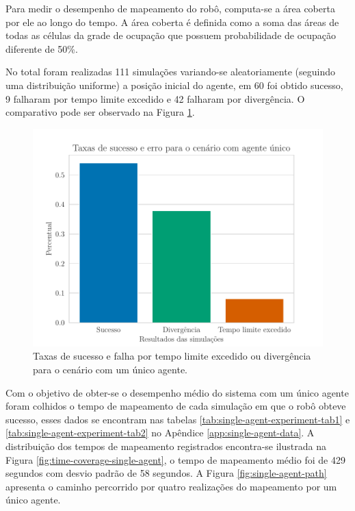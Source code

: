 Para medir o desempenho de mapeamento do robô, 
computa-se a área coberta 
por ele ao longo do tempo. A área coberta é definida como a soma das 
áreas de todas as células da grade de ocupação que possuem probabilidade 
de ocupação diferente de 50\%.

No total foram realizadas 111 simulações variando-se aleatoriamente (seguindo uma distribuição uniforme) a posição inicial do agente, em 60 foi obtido 
sucesso, 9 falharam por tempo limite excedido e 42 falharam por 
divergência. O comparativo pode ser observado na Figura \ref{fig:exp-single-robot-sucess-rate}.
\begin{figure}
  \centering
  \includegraphics[width=.7\textwidth]{figs/success_rate_bar_single_robot.pdf}
  \caption[Taxas de sucesso e falha pra simulações com um único agente]{Taxas de sucesso e falha por tempo limite excedido ou divergência para o cenário com um único agente.}
  \label{fig:exp-single-robot-sucess-rate}
\end{figure}

Com o objetivo de obter-se o desempenho médio do sistema com um único 
agente foram colhidos o tempo de mapeamento de cada simulação em que o
robô obteve sucesso, esses dados se encontram nas tabelas \ref{tab:single-agent-experiment-tab1} e \ref{tab:single-agent-experiment-tab2} no Apêndice 
\ref{app:single-agent-data}. A distribuição dos tempos de mapeamento 
registrados encontra-se ilustrada na Figura \ref{fig:time-coverage-single-agent}, o tempo de mapeamento médio foi de 
429 segundos com desvio padrão de 58 segundos. A Figura \ref{fig:single-agent-path} apresenta o caminho percorrido por quatro 
realizações do mapeamento por um único agente.

